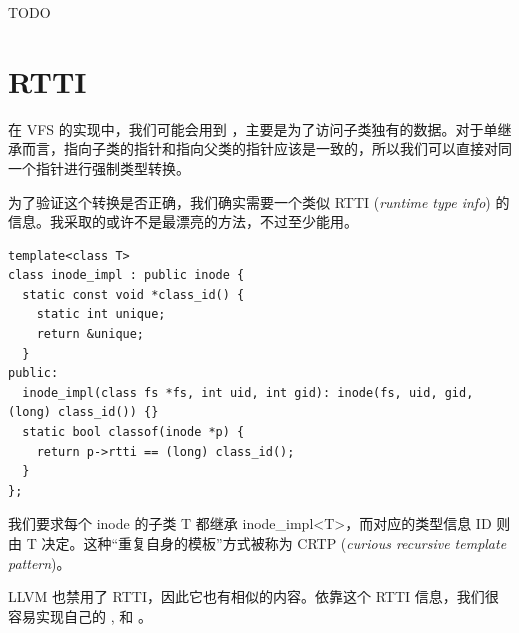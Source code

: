 TODO

\section{RTTI}
\label{sec:rtti}

在 VFS 的实现中，我们可能会用到 ，主要是为了访问子类独有的数据。对于单继承而言，指向子类的指针和指向父类的指针应该是一致的，所以我们可以直接对同一个指针进行强制类型转换。

为了验证这个转换是否正确，我们确实需要一个类似 RTTI (\textit{runtime type info}) 的信息。我采取的或许不是最漂亮的方法，不过至少能用。

\begin{verbatim}
template<class T>
class inode_impl : public inode {
  static const void *class_id() {
    static int unique;
    return &unique;
  }
public:
  inode_impl(class fs *fs, int uid, int gid): inode(fs, uid, gid, (long) class_id()) {}
  static bool classof(inode *p) {
    return p->rtti == (long) class_id();
  }
};
\end{verbatim}

我们要求每个 inode 的子类 T 都继承 inode\_impl<T>，而对应的类型信息 ID 则由 T 决定。这种“重复自身的模板”方式被称为 CRTP (\textit{curious recursive template pattern})。

LLVM 也禁用了 RTTI，因此它也有相似的内容。依靠这个 RTTI 信息，我们很容易实现自己的 ,  和 。
